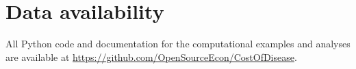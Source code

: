 \documentclass[letterpaper,12pt]{article}
\theoremstyle{definition}
\begin{document}
\section*{Data availability}

All Python code and documentation for the computational examples and analyses are available at \href{https://github.com/OpenSourceEcon/CostOfDisease}{https://github.com/OpenSourceEcon/CostOfDisease}.

\end{document}
